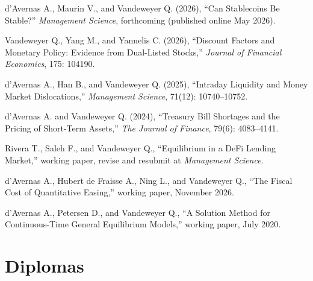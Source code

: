 \documentclass[11pt]{res} %
\begin{document}
\begin{resume}
d'Avernas A., Maurin V., and Vandeweyer Q. (2026), ``Can Stablecoins Be Stable?'' \textit{Management Science}, forthcoming (published online May 2026).

\vspace{6pt}

Vandeweyer Q., Yang M., and Yannelis C. (2026), ``Discount Factors and Monetary Policy: Evidence from Dual-Listed Stocks,'' \textit{Journal of Financial Economics}, 175: 104190.

\vspace{6pt}

d'Avernas A., Han B., and Vandeweyer Q. (2025), ``Intraday Liquidity and Money Market Dislocations,'' \textit{Management Science}, 71(12): 10740--10752.

\vspace{6pt}

d'Avernas A. and Vandeweyer Q. (2024), ``Treasury Bill Shortages and the Pricing of Short-Term Assets,'' \textit{The Journal of Finance}, 79(6): 4083--4141.

\vspace{6pt}

Rivera T., Saleh F., and Vandeweyer Q., ``Equilibrium in a DeFi Lending Market,'' working paper, revise and resubmit at \textit{Management Science}.

\vspace{6pt}

d'Avernas A., Hubert de Fraisse A., Ning L., and Vandeweyer Q., ``The Fiscal Cost of Quantitative Easing,'' working paper, November 2026.

\vspace{6pt}

d'Avernas A., Petersen D., and Vandeweyer Q., ``A Solution Method for Continuous-Time General Equilibrium Models,'' working paper, July 2020.




\section{Diplomas} 
\vspace{8pt}


\end{resume}
\end{document}
